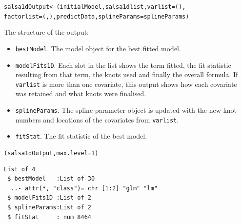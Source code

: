 \begin{frame}[fragile]
\begin{knitrout}\footnotesize
{}\color{fgcolor}\begin{kframe}
\begin{alltt}
salsa1dOutput <- (initialModel, salsa1dlist, varlist=(), 
    factorlist=(, ), predictData, splineParams=splineParams)
\end{alltt}
\end{kframe}
\end{knitrout}
\end{frame}

\begin{frame}[fragile]
\noindent The structure of the output: 
\begin{itemize}
\item {\tt bestModel}. The model object for the best fitted model.
\item {\tt modelFits1D}.  Each slot in the list shows the term fitted, the fit statistic resulting from that term, the knots used and finally the overall formula.  If {\tt varlist} is more than one covariate, this output shows how each covariate was retained and what knots were finalised.
\item {\tt splineParams}.  The spline parameter object is updated with the new knot numbers and locations of the covariates from {\tt varlist}.
\item {\tt fitStat}.  The fit statistic of the best model.
\end{itemize}

\begin{knitrout}\footnotesize
{}\color{fgcolor}\begin{kframe}
\begin{alltt}
(salsa1dOutput, max.level = 1)
\end{alltt}
\begin{verbatim}
List of 4
 $ bestModel   :List of 30
  ..- attr(*, "class")= chr [1:2] "glm" "lm"
 $ modelFits1D :List of 2
 $ splineParams:List of 2
 $ fitStat     : num 8464
\end{verbatim}
\end{kframe}
\end{knitrout}
\end{frame}

